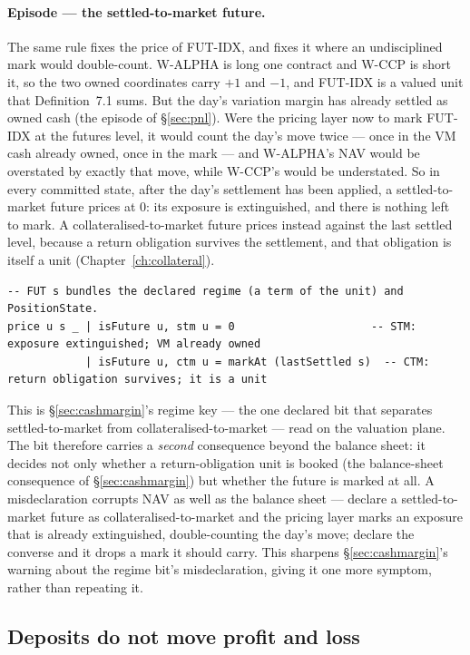 \documentclass[11pt,a4paper]{article}
\begin{document}
\paragraph{Episode --- the settled-to-market future.}
The same rule fixes the price of FUT-IDX, and fixes it where an undisciplined
mark would double-count. W-ALPHA is long one contract and W-CCP is short it, so
the two owned coordinates carry $+1$ and $-1$, and FUT-IDX is a valued unit that
Definition~7.1 sums. But the day's variation margin has already settled as owned
cash (the episode of \S\ref{sec:pnl}). Were the pricing layer now to mark FUT-IDX
at the futures level, it would count the day's move twice --- once in the VM cash
already owned, once in the mark --- and W-ALPHA's NAV would be overstated by
exactly that move, while W-CCP's would be understated. So in every committed
state, after the day's settlement has been applied, a settled-to-market future
prices at $0$: its exposure is extinguished, and there is nothing left to mark.
A collateralised-to-market future prices instead against the last settled level,
because a return obligation survives the settlement, and that obligation is itself
a unit (Chapter~\ref{ch:collateral}).

\begin{lstlisting}
-- FUT s bundles the declared regime (a term of the unit) and PositionState.
price u s _ | isFuture u, stm u = 0                     -- STM: exposure extinguished; VM already owned
            | isFuture u, ctm u = markAt (lastSettled s)  -- CTM: return obligation survives; it is a unit
\end{lstlisting}

This is \S\ref{sec:cashmargin}'s regime key --- the one declared bit that
separates settled-to-market from collateralised-to-market --- read on the
valuation plane. The bit therefore carries a \emph{second} consequence beyond
the balance sheet: it decides not only whether a return-obligation unit is booked
(the balance-sheet consequence of \S\ref{sec:cashmargin}) but whether the future
is marked at all. A misdeclaration corrupts NAV as well as the balance sheet ---
declare a settled-to-market future as collateralised-to-market and the pricing
layer marks an exposure that is already extinguished, double-counting the day's
move; declare the converse and it drops a mark it should carry. This sharpens
\S\ref{sec:cashmargin}'s warning about the regime bit's misdeclaration, giving it
one more symptom, rather than repeating it.

\subsection{Deposits do not move profit and loss}
\end{document}
